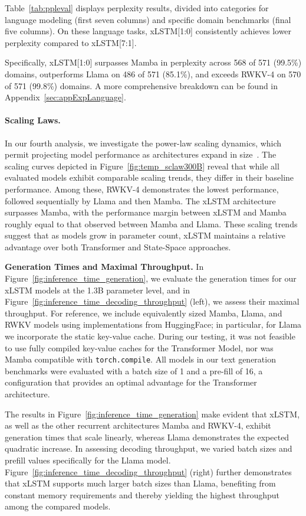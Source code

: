 Table~\ref{tab:ppleval} displays perplexity results, divided into categories for language modeling (first seven columns) and specific domain benchmarks (final five columns). On these language tasks, xLSTM[1:0] consistently achieves lower perplexity compared to xLSTM[7:1]. 

Specifically, xLSTM[1:0] surpasses Mamba in perplexity across 568 of 571 (99.5\%) domains, outperforms Llama on 486 of 571 (85.1\%), and exceeds RWKV-4 on 570 of 571 (99.8\%) domains. A more comprehensive breakdown can be found in Appendix~\ref{sec:appExpLanguage}.

\paragraph{Scaling Laws.} In our fourth analysis, we investigate the power-law scaling dynamics, which permit projecting model performance as architectures expand in size~\citep{Kaplan:20,Brown:20short}. The scaling curves depicted in Figure~\ref{fig:temp_sclaw300B} reveal that while all evaluated models exhibit comparable scaling trends, they differ in their baseline performance. Among these, RWKV-4 demonstrates the lowest performance, followed sequentially by Llama and then Mamba. The xLSTM architecture surpasses Mamba, with the performance margin between xLSTM and Mamba roughly equal to that observed between Mamba and Llama. These scaling trends suggest that as models grow in parameter count, xLSTM maintains a relative advantage over both Transformer and State-Space approaches.

\textbf{Generation Times and Maximal Throughput.} In Figure~\ref{fig:inference_time_generation}, we evaluate the generation times for our xLSTM models at the 1.3B parameter level, and in Figure~\ref{fig:inference_time_decoding_throughput} (left), we assess their maximal throughput. For reference, we include equivalently sized Mamba, Llama, and RWKV models using implementations from HuggingFace; in particular, for Llama we incorporate the static key-value cache. During our testing, it was not feasible to use fully compiled key-value caches for the Transformer Model, nor was Mamba compatible with \texttt{torch.compile}. All models in our text generation benchmarks were evaluated with a batch size of 1 and a pre-fill of 16, a configuration that provides an optimal advantage for the Transformer architecture.

The results in Figure~\ref{fig:inference_time_generation} make evident that xLSTM, as well as the other recurrent architectures Mamba and RWKV-4, exhibit generation times that scale linearly, whereas Llama demonstrates the expected quadratic increase. In assessing decoding throughput, we varied batch sizes and prefill values specifically for the Llama model. Figure~\ref{fig:inference_time_decoding_throughput} (right) further demonstrates that xLSTM supports much larger batch sizes than Llama, benefiting from constant memory requirements and thereby yielding the highest throughput among the compared models.

